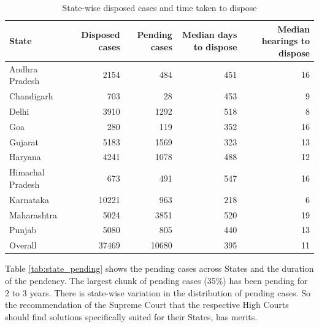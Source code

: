 \documentclass[12pt,a4paper]{article}
\begin{document}
{\footnotesize \begin{longtable}{@{}lrrrr@{}}
 \caption{State-wise disposed cases and time taken to dispose}\label{tab:state_disposal}\\
\toprule
\textbf{State} & \multicolumn{1}{p{2cm}}{\textbf{Disposed cases}} & \multicolumn{1}{p{2cm}}{\textbf{Pending cases}} & \multicolumn{1}{p{3cm}}{\textbf{Median days to dispose}} & \multicolumn{1}{p{3cm}}{\textbf{Median hearings to dispose}} \\
\midrule
Andhra Pradesh & 2154 & 484 & 451 & 16 \\
Chandigarh & 703 & 28 & 453 & 9 \\
Delhi & 3910 & 1292 & 518 & 8 \\
Goa & 280 & 119 & 352 & 16 \\
Gujarat & 5183 & 1569 & 323 & 13 \\
Haryana & 4241 & 1078 & 488 & 12 \\
Himachal Pradesh & 673 & 491 & 547 & 16 \\
Karnataka & 10221 & 963 & 218 & 6 \\
Maharashtra & 5024 & 3851 & 520 & 19 \\
Punjab & 5080 & 805 & 440 & 13 \\
\midrule
Overall & 37469 & 10680 & 395 & 11 \\
\bottomrule
\end{longtable}}

Table \ref{tab:state_pending} shows the pending cases across States and the duration of the pendency. The largest chunk of pending cases (35\%) has been pending for 2 to 3 years. There is state-wise variation in the distribution of pending cases. So the recommendation of the Supreme Court that the respective High Courts should find solutions specifically suited for their States, has merits.
\end{document}
